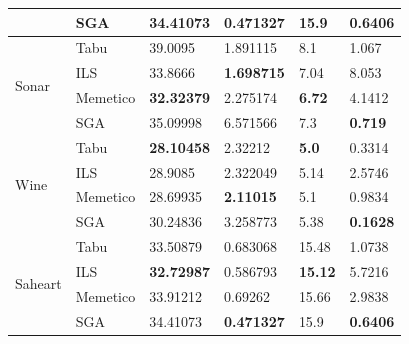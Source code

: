 \documentclass[11pt]{article}
\begin{document}
\begin{table}[h]
{\begin{tabular}{ |l|l|l|l|l|l| }
                              & SGA      & 34.41073   & \bf{0.471327}     &  15.9   & \bf{0.6406}\\ \hline
    \multirow{4}{*}{Sonar}  & Tabu     & 39.0095    & 1.891115     &  8.1    & 1.067 \\
                            & ILS      & 33.8666    & \bf{1.698715}     &  7.04   & 8.053 \\
                            & Memetico & \bf{32.32379}   & 2.275174     &  \bf{6.72}   & 4.1412 \\
                            & SGA      & 35.09998   & 6.571566     &  7.3    & \bf{0.719}\\ \hline
    \multirow{4}{*}{Wine} & Tabu     & \bf{28.10458}   &  2.32212     &  \bf{5.0}      & 0.3314 \\
                          & ILS      & 28.9085    &  2.322049    &  5.14   & 2.5746 \\
                          & Memetico & 28.69935   &  \bf{2.11015}     &  5.1    & 0.9834 \\
                          & SGA      & 30.24836   &  3.258773    &  5.38   & \bf{0.1628}\\ \hline
    \multirow{4}{*}{Saheart}  & Tabu     & 33.50879   & 0.683068     &  15.48  & 1.0738 \\
                              & ILS      & \bf{32.72987}   & 0.586793     &  \bf{15.12}  & 5.7216 \\
                              & Memetico & 33.91212   & 0.69262      &  15.66  & 2.9838 \\
                              & SGA      & 34.41073   & \bf{0.471327}     &  15.9   & \bf{0.6406}\\ \hline
\end{tabular}
}
\end{table}

\newpage
\vfill
\end{document}
